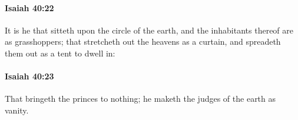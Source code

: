 		\paragraph{Isaiah 40:22} %
			\label{ISAIAH-40-22}

			It is he that sitteth upon the circle of the earth, and the inhabitants thereof are as grasshoppers; that stretcheth out the heavens as a curtain, and spreadeth them out as a tent to dwell in:


		\paragraph{Isaiah 40:23} %
			\label{ISAIAH-40-23}

			That bringeth the princes to nothing; he maketh the judges of the earth as vanity.


